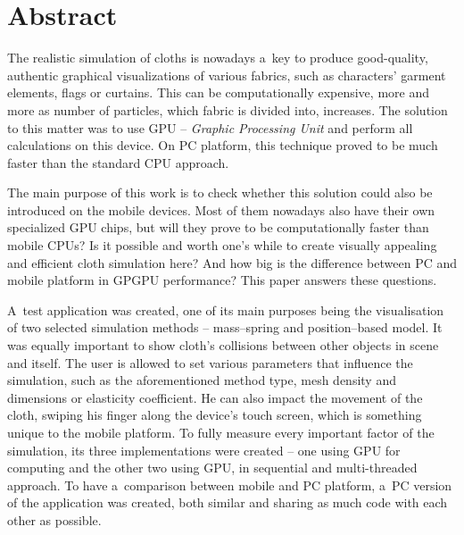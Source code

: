 \chapter*{Abstract}


The realistic simulation of cloths is nowadays a~key to produce good-quality, authentic graphical visualizations of various fabrics, such as characters' garment elements, flags or curtains. This can be computationally expensive, more and more as number of particles, which fabric is divided into, increases. The solution to this matter was to use GPU -- \emph{Graphic Processing Unit} and perform all calculations on this device. On PC platform, this technique proved to be much faster than the standard CPU approach.

The main purpose of this work is to check whether this solution could also be introduced on the mobile devices. Most of them nowadays also have their own specialized GPU chips, but will they prove to be computationally faster than mobile CPUs? Is it possible and worth one's while to create visually appealing and efficient cloth simulation here? And how big is the difference between PC and mobile platform in GPGPU performance? This paper answers these questions.

A~test application was created, one of its main purposes being the visualisation of two selected simulation methods -- mass--spring and position--based model. It was equally important to show cloth's collisions between other objects in scene and itself. The user is allowed to set various parameters that influence the simulation, such as the aforementioned method type, mesh density and dimensions or elasticity coefficient. He can also impact the movement of the cloth, swiping his finger along the device's touch screen, which is something unique to the mobile platform. To fully measure every important factor of the simulation, its three implementations were created -- one using GPU for computing and the other two using GPU, in sequential and multi-threaded approach. To have a~comparison between mobile and PC platform, a~PC version of the application was created, both similar and sharing as much code with each other as possible.

